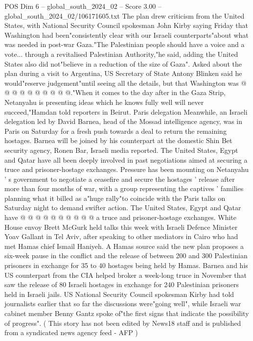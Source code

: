 \begin{textsample}{POS Dim 6 – global\_south\_2024\_02 – Score 3.00 – global\_south\_2024\_02/106171605.txt}
The plan drew criticism from the United States, with National Security Council spokesman John Kirby saying Friday that Washington had been"consistently clear with our Israeli counterparts"about what was needed in post-war Gaza."The Palestinian people should have a voice and a vote... through a revitalised Palestinian Authority,"he said, adding the United States also did not"believe in a reduction of the size of Gaza".
Asked about the plan during a visit to Argentina, US Secretary of State Antony Blinken said he would"reserve judgement"until seeing all the details, but that Washington was @ @ @ @ @ @ @ @ @ @."When it comes to the day after in the Gaza Strip, Netanyahu is presenting ideas which he knows fully well will never succeed,"Hamdan told reporters in Beirut.
Paris delegation Meanwhile, an Israeli delegation led by David Barnea, head of the Mossad intelligence agency, was in Paris on Saturday for a fresh push towards a deal to return the remaining hostages.
Barnea will be joined by his counterpart at the domestic Shin Bet security agency, Ronen Bar, Israeli media reported.
The United States, Egypt and Qatar have all been deeply involved in past negotiations aimed at securing a truce and prisoner-hostage exchanges.
Pressure has been mounting on Netanyahu ' s government to negotiate a ceasefire and secure the hostages ' release after more than four months of war, with a group representing the captives ' families planning what it billed as a"huge rally"to coincide with the Paris talks on Saturday night to demand swifter action.
The United States, Egypt and Qatar have @ @ @ @ @ @ @ @ @ @ a truce and prisoner-hostage exchanges.
White House envoy Brett McGurk held talks this week with Israeli Defence Minister Yoav Gallant in Tel Aviv, after speaking to other mediators in Cairo who had met Hamas chief Ismail Haniyeh.
A Hamas source said the new plan proposes a six-week pause in the conflict and the release of between 200 and 300 Palestinian prisoners in exchange for 35 to 40 hostages being held by Hamas.
Barnea and his US counterpart from the CIA helped broker a week-long truce in November that saw the release of 80 Israeli hostages in exchange for 240 Palestinian prisoners held in Israeli jails.
US National Security Council spokesman Kirby had told journalists earlier that so far the discussions were"going well", while Israeli war cabinet member Benny Gantz spoke of"the first signs that indicate the possibility of progress". ( This story has not been edited by News18 staff and is published from a syndicated news agency feed - AFP )

\end{textsample}
